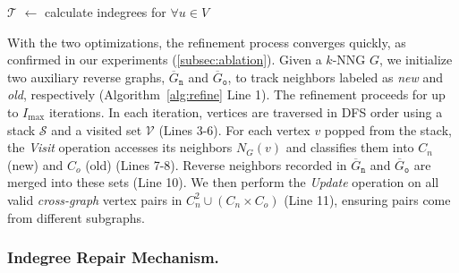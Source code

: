 \documentclass[acmsmall]{acmart}
\theoremstyle{remark}
\theoremstyle{definition}
\begin{document}
\begin{algorithm}[t]\small
	\DontPrintSemicolon
	
	$\mathcal{T}$ $\gets$ calculate indegrees for $\forall u \in V$\;
	\;
	
	\caption{Indegree Repair Heuristic}
	\label{alg:repair}
\end{algorithm}

With the two optimizations, the refinement process converges quickly, as confirmed in our experiments (\textsection\ref{subsec:ablation}). Given a $k$-NNG $G$, we initialize two auxiliary reverse graphs, $\overline{G}_{\texttt{n}}$ and $\overline{G}_{\texttt{o}}$, to track neighbors labeled as \textit{new} and \textit{old}, respectively (Algorithm~\ref{alg:refine} Line 1). The refinement proceeds for up to $I_{\text{max}}$ iterations. In each iteration, vertices are traversed in DFS order using a stack $\mathcal{S}$ and a visited set $\mathcal{V}$ (Lines 3-6). For each vertex $v$ popped from the stack, the \textit{Visit} operation accesses its neighbors $N_G(v)$ and classifies them into $C_n$ (new) and $C_o$ (old) (Lines 7-8). Reverse neighbors recorded in $\overline{G}_{\texttt{n}}$ and $\overline{G}_{\texttt{o}}$ are merged into these sets (Line 10). We then perform the \textit{Update} operation on all valid \textit{cross-graph} vertex pairs in $C_n^2 \cup (C_n \times C_o)$ (Line 11), ensuring pairs come from different subgraphs.



\subsubsection{Indegree Repair Mechanism.}
\end{document}
